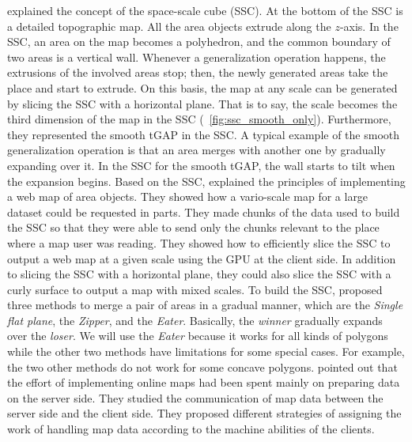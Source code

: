 \documentclass[ijgi,article,submit,moreauthors,pdftex]{Definitions/mdpi}
\begin{document}
 explained the concept of the space-scale cube (SSC).
At the bottom of the SSC is a detailed topographic map.
All the area objects extrude along the $z$-axis.
In the SSC, an area on the map becomes a polyhedron, and
the common boundary of two areas is a vertical wall.
Whenever a generalization operation happens, 
the extrusions of the involved areas stop;
then, the newly generated areas take the place and start to extrude.
On this basis, the map at any scale can be generated by slicing the SSC 
with a horizontal plane.
That is to say, the scale becomes the third dimension of the map in the SSC
(\eg~\fig\ref{fig:ssc_smooth_only}).
Furthermore, they represented the smooth tGAP in the SSC.
A typical example of the smooth generalization operation is that 
an area merges with another one by gradually expanding over it.
In the SSC for the smooth tGAP, 
the wall starts to tilt when the expansion begins.
Based on the SSC, \citet{Meijers2020Web} explained the principles of 
implementing a web map of area objects.
They showed how a vario-scale map for a large dataset 
could be requested in parts.
They made chunks of the data used to build the SSC
so that they were able to send only the chunks relevant to the place
where a map user was reading.
They showed how to efficiently slice the SSC to output a web map at a given scale 
using the GPU at the client side.
In addition to slicing the SSC with a horizontal plane,
they could also slice the SSC with a curly surface 
to output a map with mixed scales.
To build the SSC, \citet{Suba2014Merge} proposed three methods 
to merge a pair of areas in a gradual manner, 
which are the \emph{Single flat plane}, the \emph{Zipper}, and the \emph{Eater}.
Basically, the \emph{winner} gradually expands over the \emph{loser}.
We will use the \emph{Eater} because it works for all kinds of polygons 
while the other two methods have limitations for some special cases.
For example, the two other methods do not work for some concave polygons.
\citet{Huang2016Webmap} pointed out that
the effort of implementing online maps 
had been spent mainly on preparing data on the server side.
They studied the communication of map data 
between the server side and the client side.
They proposed different strategies of assigning 
the work of handling map data
according to the machine abilities of the clients.
\end{document}
